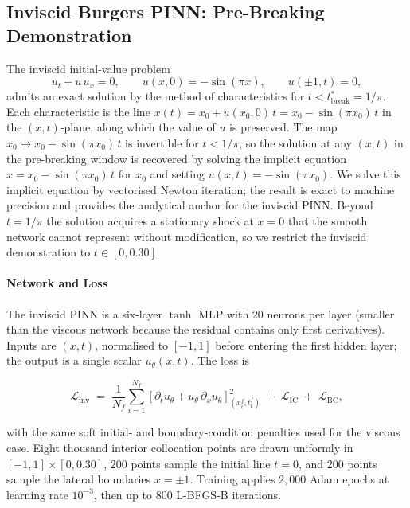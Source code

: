 \documentclass[11pt,a4paper]{report}
\begin{document}
\subsection{Inviscid Burgers PINN: Pre-Breaking Demonstration}
\label{sec:burgers_inviscid_demo}

The inviscid initial-value problem
\[
u_{t} + u\,u_{x} = 0,
\qquad u(x, 0) = -\sin(\pi x),
\qquad u(\pm 1, t) = 0,
\]
admits an exact solution by the method of characteristics for $t < t^{*}_{\mathrm{break}} = 1/\pi$. Each characteristic is the line $x(t) = x_{0} + u(x_{0}, 0)\,t = x_{0} - \sin(\pi x_{0})\,t$ in the $(x, t)$-plane, along which the value of $u$ is preserved. The map $x_{0} \mapsto x_{0} - \sin(\pi x_{0})\,t$ is invertible for $t < 1/\pi$, so the solution at any $(x, t)$ in the pre-breaking window is recovered by solving the implicit equation $x = x_{0} - \sin(\pi x_{0})\,t$ for $x_{0}$ and setting $u(x, t) = -\sin(\pi x_{0})$. We solve this implicit equation by vectorised Newton iteration; the result is exact to machine precision and provides the analytical anchor for the inviscid PINN. Beyond $t = 1/\pi$ the solution acquires a stationary shock at $x = 0$ that the smooth network cannot represent without modification, so we restrict the inviscid demonstration to $t \in [0, 0.30]$.

\paragraph{Network and Loss}
The inviscid PINN is a six-layer $\tanh$ MLP with $20$ neurons per layer (smaller than the viscous network because the residual contains only first derivatives). Inputs are $(x, t)$, normalised to $[-1, 1]$ before entering the first hidden layer; the output is a single scalar $u_{\theta}(x, t)$. The loss is

\begin{equation}
\label{eq:burgers_inv_loss}
\mathcal{L}_{\mathrm{inv}} \;=\; \frac{1}{N_{f}}\sum_{i=1}^{N_{f}}
\!\left[ \partial_{t} u_{\theta} + u_{\theta}\,\partial_{x} u_{\theta} \right]^{2}_{(x_{i}^{f}, t_{i}^{f})}
\;+\; \mathcal{L}_{\mathrm{IC}}
\;+\; \mathcal{L}_{\mathrm{BC}},
\end{equation}

with the same soft initial- and boundary-condition penalties used for the viscous case. Eight thousand interior collocation points are drawn uniformly in $[-1, 1] \times [0, 0.30]$, $200$ points sample the initial line $t = 0$, and $200$ points sample the lateral boundaries $x = \pm 1$. Training applies $2{,}000$ Adam epochs at learning rate $10^{-3}$, then up to $800$ L-BFGS-B iterations.
\end{document}
